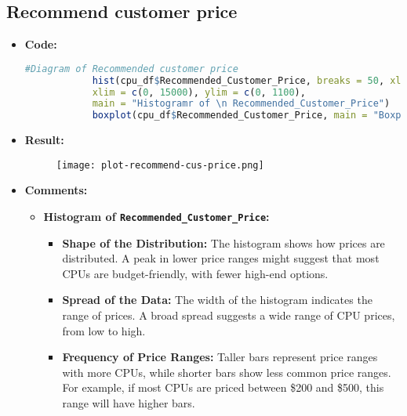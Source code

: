\documentclass{article}
\begin{document}
	\subsection{Recommend customer price}
	\begin{itemize}
		\item \textbf{Code:}
		\begin{lstlisting}[basicstyle=\ttfamily, frame=single,language=R]
			#Diagram of Recommended customer price
			hist(cpu_df$Recommended_Customer_Price, breaks = 50, xlab = "Dollar", ylab = "Frequency",
			xlim = c(0, 15000), ylim = c(0, 1100),
			main = "Histogramr of \n Recommended_Customer_Price")
			boxplot(cpu_df$Recommended_Customer_Price, main = "Boxplot of \n Recommended_Customer_Price")
		\end{lstlisting}
		\item \textbf{Result:}
		\begin{figure}[h]
			\centering
			\texttt{[image: plot-recommend-cus-price.png]}   %
			\label{fig:recommend-cus-price}
		\end{figure}
		
		\item \textbf{Comments:}
		\begin{itemize}
			\item \textbf{Histogram of \texttt{Recommended\_Customer\_Price}:}
			\begin{itemize}
				\item \textbf{Shape of the Distribution:} 
				The histogram shows how prices are distributed. A peak in lower price ranges might suggest that most CPUs are budget-friendly, with fewer high-end options.
				\item \textbf{Spread of the Data:} 
				The width of the histogram indicates the range of prices. A broad spread suggests a wide range of CPU prices, from low to high.
				\item \textbf{Frequency of Price Ranges:} 
				Taller bars represent price ranges with more CPUs, while shorter bars show less common price ranges. For example, if most CPUs are priced between \$200 and \$500, this range will have higher bars.
			\end{itemize}
			

\end{itemize}
\end{itemize}
\end{document}
